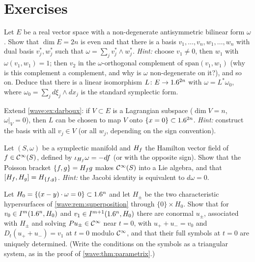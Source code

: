 \section{Exercises}

\begin{exercise}\label{wave:ex:darboux}
Let $E$ be a real vector space with a non-degenerate antisymmetric bilinear form
$\omega$. Show that $\dim E=2n$ is even and that there is a basis
$v_1,\dots,v_n,w_1,\dots,w_n$ with dual basis $v_j^*,w_j^*$ such that
$\omega=\sum_jv_j^*\wedge w_j^*$. \emph{Hint:} choose $v_1\ne0$, then $w_1$ with
$\omega(v_1,w_1)=1$; then $v_2$ in the $\omega$-orthogonal complement of $\mathrm{span}(v_1,w_1)$ (why
is this complement a complement, and why is $\omega$ non-degenerate on it?), and so on.
Deduce that there is a linear isomorphism $L\colon E\to1.6^{2n}$ with $\omega=L^*\omega_0$, where
$\omega_0=\sum_jd\xi_j\wedge dx_j$ is the standard symplectic form.
\end{exercise}

\begin{exercise}\label{wave:ex:lagrangian}
Extend \cref{wave:ex:darboux}: if $V\subset E$ is a Lagrangian subspace ($\dim V=n$,
$\omega|_V=0$), then $L$ can be chosen to map $V$ onto $\{x=0\}\subset1.6^{2n}$. \emph{Hint:}
construct the basis with all $v_j\in V$ (or all $w_j$, depending on the sign convention).
\end{exercise}

\begin{exercise}\label{wave:ex:poisson}
Let $(S,\omega)$ be a symplectic manifold and $H_{f}$ the Hamilton vector field of
$f\in\mathcal{C}^\infty(S)$, defined by $\iota_{H_{f}}\omega=-df$ (or with the opposite sign). Show that the
Poisson bracket $\{f,g\}=H_{f}g$ makes $\mathcal{C}^\infty(S)$ into a Lie algebra, and that
$[H_{f},H_{g}]=H_{\{f,g\}}$. \emph{Hint:} the Jacobi identity is equivalent to $d\omega=0$.
\end{exercise}

\begin{exercise}\label{wave:ex:initial-split}
Let $H_0=\{(x-y)\cdot\omega=0\}\subset1.6^n$ and let $H_\pm$ be the two characteristic
hypersurfaces of \cref{wave:rem:superposition} through $\{0\}\times H_0$. Show that for
$v_0\in I^{m}(1.6^n,H_0)$ and $v_1\in I^{m+1}(1.6^n,H_0)$ there are conormal $u_\pm$,
associated with $H_\pm$ and solving $Pu_\pm\in\mathcal{C}^\infty$ near $t=0$, with $u_++u_-=v_0$ and
$D_t(u_++u_-)=v_1$ at $t=0$ modulo $\mathcal{C}^\infty$, and that their full symbols at $t=0$ are
uniquely determined. (Write the conditions on the symbols as a triangular system,
as in the proof of \cref{wave:thm:parametrix}.)
\end{exercise}

